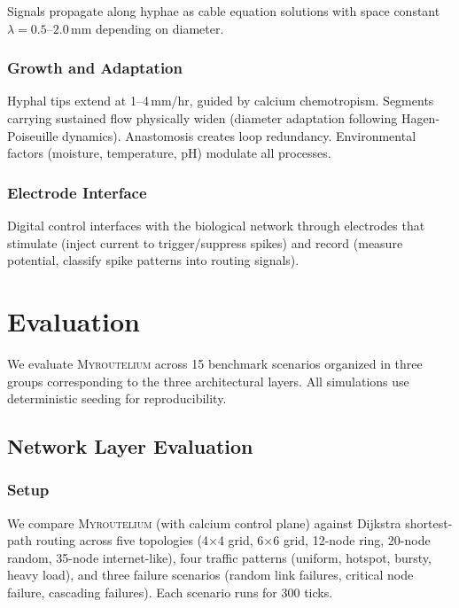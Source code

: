 \documentclass[conference,10pt]{IEEEtran}
\newcommand{\myc}{\textsc{Myroutelium}}
\begin{document}
Signals propagate along hyphae as cable equation solutions with space constant $\lambda = 0.5$--$2.0$\,mm depending on diameter.

\subsubsection{Growth and Adaptation}

Hyphal tips extend at 1--4\,mm/hr, guided by calcium chemotropism. Segments carrying sustained flow physically widen (diameter adaptation following Hagen-Poiseuille dynamics). Anastomosis creates loop redundancy. Environmental factors (moisture, temperature, pH) modulate all processes.

\subsubsection{Electrode Interface}

Digital control interfaces with the biological network through electrodes that stimulate (inject current to trigger/suppress spikes) and record (measure potential, classify spike patterns into routing signals).

\section{Evaluation}
\label{sec:eval}

We evaluate \myc{} across 15 benchmark scenarios organized in three groups corresponding to the three architectural layers. All simulations use deterministic seeding for reproducibility.

\subsection{Network Layer Evaluation}

\subsubsection{Setup}

We compare \myc{} (with calcium control plane) against Dijkstra shortest-path routing across five topologies (4$\times$4 grid, 6$\times$6 grid, 12-node ring, 20-node random, 35-node internet-like), four traffic patterns (uniform, hotspot, bursty, heavy load), and three failure scenarios (random link failures, critical node failure, cascading failures). Each scenario runs for 300 ticks.
\end{document}
